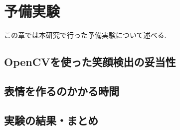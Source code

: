 \chapter{予備実験}
\label{chap:pre_experiment}

この章では本研究で行った予備実験について述べる.
\section{OpenCVを使った笑顔検出の妥当性}
\section{表情を作るのかかる時間}
\section{実験の結果・まとめ}
